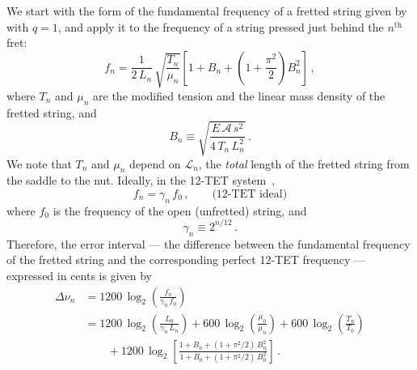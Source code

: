 We start with the form of the fundamental frequency of a fretted string given by  with $q = 1$, and apply it to the frequency of a string pressed just behind the $n^\mathrm{th}$ fret:
 \begin{equation} \label{eqn:f_n_def}
f_n = \frac{1}{2\, L_n}\, \sqrt{\frac{T_n}{\mu_n}} \left[ 1 + B_n + \left(1 + \frac{\pi^2}{2}\right) B_n^2 \right]\, ,
 \end{equation}
where $T_n$ and $\mu_n$ are the modified tension and the linear mass density of the fretted string, and
 \begin{equation} \label{eqn:b_n_def}
B_n \equiv \sqrt{\frac{E\, \mathcal{A}\, s^2}{4\, T_n\, L_n^2}}\, .
 \end{equation}
We note that $T_n$ and $\mu_n$ depend on $\mathcal{L}_n$, the \emph{total} length of the fretted string from the saddle to the nut. Ideally, in the 12-TET system~\cite{ref:durfee2015pms},
 \begin{equation} \label{eqn:f_n_tet}
f_n = \gamma_n\, f_0\, , \qquad \textrm{(12-TET~ideal)}
 \end{equation}
where $f_0$ is the frequency of the open (unfretted) string, and
 \begin{equation} \label{eqn:gamme_n_def}
\gamma_n \equiv 2^{n / 12}\, .
 \end{equation}
Therefore, the error interval --- the difference between the fundamental frequency of the fretted string and the corresponding perfect 12-TET frequency --- expressed in cents is given by
 \begin{equation}\label{eqn:error_def}
 \begin{split}
\Delta \nu_n &= 1200\, \log_2\left( \frac{f_n}{\gamma_n\, f_0} \right) \\
&= 1200\, \log_2 \left( \frac{L_0}{\gamma_n\, L_n} \right) + 600\, \log_2 \left(  \frac{\mu_0}{\mu_n} \right) + 600\, \log_2 \left( \frac{T_n}{T_0} \right) \\
&\qquad + 1200\, \log_2 \left[ \frac{1 + B_n + (1 + \pi^2/2)\, B_n^2}{1 + B_0 + (1 + \pi^2/2)\, B_0^2} \right]\, .
 \end{split}
 \end{equation}

